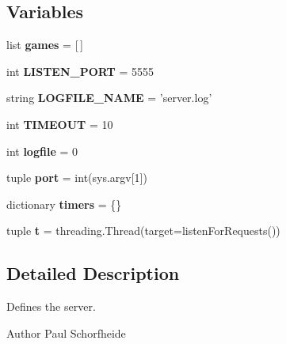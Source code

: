 \subsection*{Variables}
\begin{DoxyCompactItemize}
\item 
\hypertarget{namespaceserver_ac2c7fa83dd66e394d014ac236809fbf7}{
list {\bfseries games} = \mbox{[}$\,$\mbox{]}}
\label{namespaceserver_ac2c7fa83dd66e394d014ac236809fbf7}

\item 
\hypertarget{namespaceserver_a44ff5c8a0709041cc59ca91e2dd66ff5}{
int {\bfseries LISTEN\_\-PORT} = 5555}
\label{namespaceserver_a44ff5c8a0709041cc59ca91e2dd66ff5}

\item 
\hypertarget{namespaceserver_ae35e6c2886e7d971de061928e5d3f129}{
string {\bfseries LOGFILE\_\-NAME} = 'server.log'}
\label{namespaceserver_ae35e6c2886e7d971de061928e5d3f129}

\item 
\hypertarget{namespaceserver_a2a02a56ac8c1f577826ab016237bd8db}{
int {\bfseries TIMEOUT} = 10}
\label{namespaceserver_a2a02a56ac8c1f577826ab016237bd8db}

\item 
\hypertarget{namespaceserver_a3a814bbedcb542946b3f72097703aa17}{
int {\bfseries logfile} = 0}
\label{namespaceserver_a3a814bbedcb542946b3f72097703aa17}

\item 
\hypertarget{namespaceserver_af4de76de20802875897b283f7cdf93e4}{
tuple {\bfseries port} = int(sys.argv\mbox{[}1\mbox{]})}
\label{namespaceserver_af4de76de20802875897b283f7cdf93e4}

\item 
\hypertarget{namespaceserver_a314f68f9bde3d44b5d98d7c73af7b8d7}{
dictionary {\bfseries timers} = \{\}}
\label{namespaceserver_a314f68f9bde3d44b5d98d7c73af7b8d7}

\item 
\hypertarget{namespaceserver_a3db0278fc2eadcf5ab797481e89b0840}{
tuple {\bfseries t} = threading.Thread(target=listenForRequests())}
\label{namespaceserver_a3db0278fc2eadcf5ab797481e89b0840}

\end{DoxyCompactItemize}


\subsection{Detailed Description}
Defines the server. \begin{DoxyAuthor}{Author}
Paul Schorfheide 
\end{DoxyAuthor}
